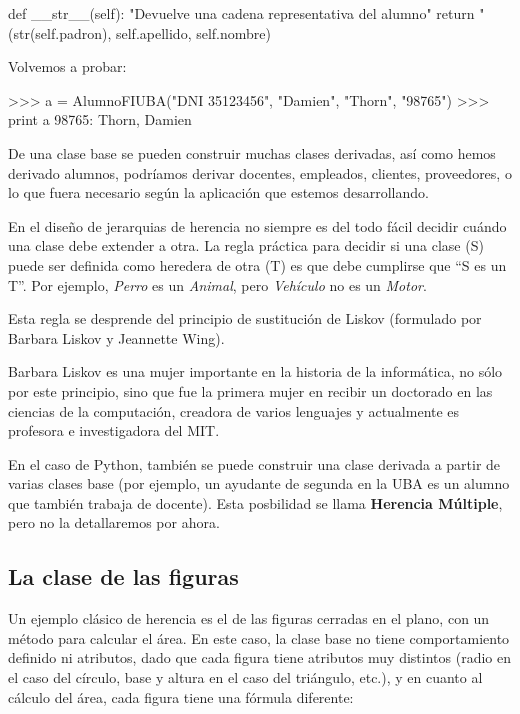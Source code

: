 \begin{codigo-python-sn}
    def __str__(self):
        "Devuelve una cadena representativa del alumno"
        return "%
            (str(self.padron), self.apellido, self.nombre)
\end{codigo-python-sn}

Volvemos a probar:

\begin{codigo-python-sn}
>>> a = AlumnoFIUBA("DNI 35123456", "Damien", "Thorn", "98765")
>>> print a
98765: Thorn, Damien
\end{codigo-python-sn}

De una clase base se pueden construir muchas clases derivadas, así como
hemos derivado alumnos, podríamos derivar docentes, empleados, clientes,
proveedores, o lo que fuera necesario según la aplicación que estemos
desarrollando.

\begin{sabias_que}
En el diseño de jerarquias de herencia no siempre es del todo fácil decidir 
cuándo una clase debe extender a otra.
La regla práctica para decidir si una clase (S) puede ser
definida como heredera de otra (T) es que debe cumplirse que ``S es un T''.
Por ejemplo, {\it Perro} es un {\it Animal}, pero {\it Vehículo} no es un {\it
Motor}.

Esta regla se desprende del principio de sustitución de Liskov (formulado por
Barbara Liskov y Jeannette Wing).

Barbara Liskov es una mujer importante en la historia de la informática, no
sólo por este principio, sino que fue la primera mujer en recibir un doctorado
en las ciencias de la computación, creadora de varios lenguajes y actualmente
es profesora e investigadora del MIT.
\end{sabias_que}

En el caso de Python, también se puede construir una clase derivada a partir de
varias clases base (por ejemplo, un ayudante de segunda en la UBA es un alumno
que también trabaja de docente).  Esta posbilidad se llama {\bf Herencia
Múltiple}, pero no la detallaremos por ahora.

\subsection*{La clase de las figuras}

Un ejemplo clásico de herencia es el de las figuras cerradas en el plano, con un
método para calcular el área. En este caso, la clase base no tiene comportamiento definido
ni atributos, dado que cada figura tiene atributos muy distintos (radio en el caso
del círculo, base y altura en el caso del triángulo, etc.), y en cuanto al cálculo
del área, cada figura tiene una fórmula diferente:

